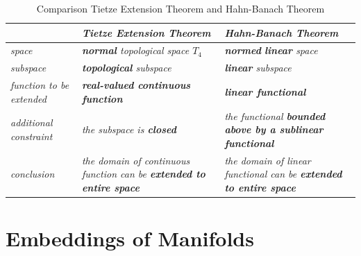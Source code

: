 \documentclass[11pt]{article}
\begin{document}
\begin{table}[t]
\setlength{\abovedisplayskip}{0pt}
\setlength{\belowdisplayskip}{-10pt}
\setlength{\abovedisplayshortskip}{0pt}
\setlength{\belowdisplayshortskip}{0pt}
\footnotesize
\centering
\caption{Comparison Tietze Extension Theorem and Hahn-Banach Theorem}
\label{tab: extension}
\renewcommand\tabularxcolumn[1]{m{#1}}
\small
\begin{tabularx}{1\textwidth} { 
  | >{\raggedright\arraybackslash} m{3cm}
  | >{\centering\arraybackslash}X
  | >{\centering\arraybackslash}X  | }
 \hline
  &  \emph{\textbf{Tietze Extension Theorem}} & \emph{\textbf{Hahn-Banach Theorem}}   \\
  \hline \vspace{5pt}
\emph{space}    \vspace{2pt} & \emph{\textbf{normal} topological space $T_4$ }  & \emph{\textbf{normed} \textbf{linear} space} \\
 \hline \vspace{5pt}
\emph{subspace}  \vspace{2pt} &  \emph{\textbf{topological} subspace}  & \emph{\textbf{linear} subspace}  \\
 \hline \vspace{5pt}
\emph{function to be extended} \vspace{2pt}  &  \emph{\textbf{real-valued continuous function }}  & \emph{\textbf{linear functional}}  \\
\hline \vspace{5pt}
\emph{additional constraint}  \vspace{2pt}  & \emph{the subspace is \textbf{closed}}    & \emph{the functional \textbf{bounded above by a sublinear functional}}  \\
\hline \vspace{5pt}
\emph{conclusion}  \vspace{2pt}  & \emph{the domain of continuous function can be \textbf{extended to entire space}}    & \emph{the domain of linear functional can be \textbf{extended to entire space}}  \\
\hline
\end{tabularx}
\end{table}

\section{Embeddings of Manifolds}

\newpage
\end{document}
